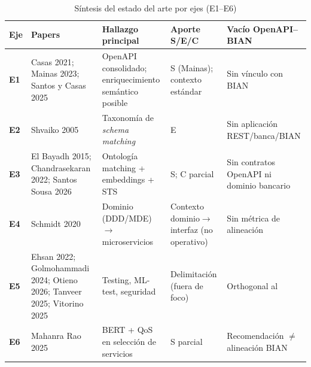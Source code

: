 \begin{table}[H]
  \centering
  \caption{Síntesis del estado del arte por ejes (E1--E6)}
  \label{tab:sintesis-ejes}
  \small
  \begin{tabular}{@{}p{}p{}p{}p{}p{}@{}}
    \toprule
    \textbf{Eje} & \textbf{Papers} & \textbf{Hallazgo principal} & \textbf{Aporte S/E/C} & \textbf{Vacío OpenAPI--BIAN} \\
    \midrule
    \textbf{E1} &
    Casas 2021; Mainas 2023; Santos y Casas 2025 &
    OpenAPI consolidado; enriquecimiento semántico posible &
    S (Mainas); contexto estándar &
    Sin vínculo con \ServiceDomain{} BIAN \\
    \textbf{E2} &
    Shvaiko 2005 &
    Taxonomía de \textit{schema matching} &
    E &
    Sin aplicación REST/banca/BIAN \\
    \textbf{E3} &
    El Bayadh 2015; Chandrasekaran 2022; Santos Sousa 2026 &
    Ontología matching + embeddings + STS &
    S; C parcial &
    Sin contratos OpenAPI ni dominio bancario \\
    \textbf{E4} &
    Schmidt 2020 &
    Dominio (DDD/MDE) $\rightarrow$ microservicios &
    Contexto dominio$\rightarrow$interfaz (no \StructuralScore{} operativo) &
    Sin métrica de alineación \\
    \textbf{E5} &
    Ehsan 2022; Golmohammadi 2024; Otieno 2026; Tanveer 2025; Vitorino 2025 &
    Testing, ML-test, seguridad &
    Delimitación (fuera de foco) &
    Orthogonal al \AlignmentScore{} \\
    \textbf{E6} &
    Mahanra Rao 2025 &
    BERT + QoS en selección de servicios &
    S parcial &
    Recomendación $\neq$ alineación BIAN \\
    \bottomrule
  \end{tabular}
\end{table}
